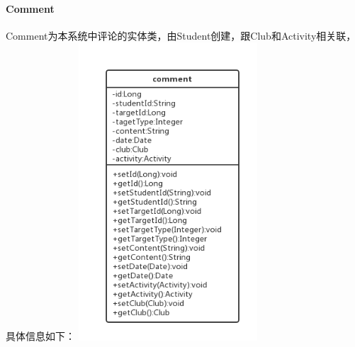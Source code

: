 \documentclass[UTF8]{ctexart}
\begin{document}
\paragraph{Comment}
Comment为本系统中评论的实体类，由Student创建，跟Club和Activity相关联，具体信息如下：
\newline
\includegraphics[width = 0.5\textwidth]{comment-class.png}
\newline
\end{document}
